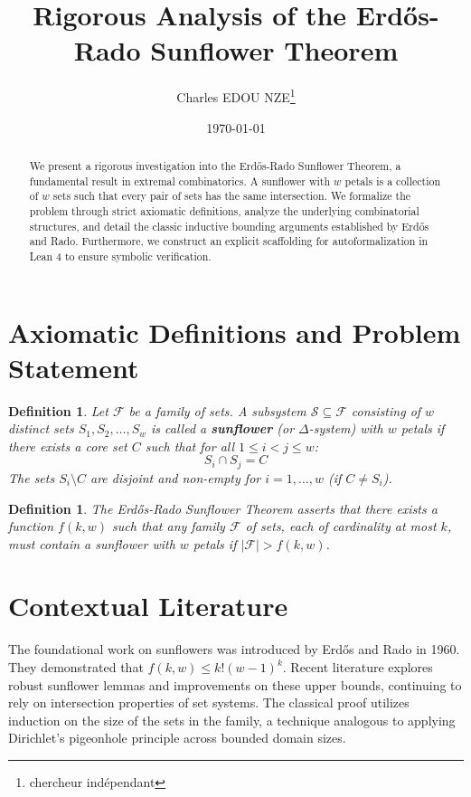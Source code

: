 \documentclass[12pt,a4paper]{article}
\title{Rigorous Analysis of the Erd\H{o}s-Rado Sunflower Theorem}
\author{Charles EDOU NZE\thanks{chercheur ind\'ependant}}
\date{\today}
\newtheorem{definition}[theorem]{Definition}
\begin{document}
\maketitle
\thispagestyle{fancy}
\fancyhf{}
\renewcommand{\headrulewidth}{0pt}

\begin{abstract}
We present a rigorous investigation into the Erd\H{o}s-Rado Sunflower Theorem, a fundamental result in extremal combinatorics. A sunflower with $w$ petals is a collection of $w$ sets such that every pair of sets has the same intersection. We formalize the problem through strict axiomatic definitions, analyze the underlying combinatorial structures, and detail the classic inductive bounding arguments established by Erd\H{o}s and Rado. Furthermore, we construct an explicit scaffolding for autoformalization in Lean 4 to ensure symbolic verification.
\end{abstract}

\section{Axiomatic Definitions and Problem Statement}
\begin{definition}
Let $\mathcal{F}$ be a family of sets. A subsystem $\mathcal{S} \subseteq \mathcal{F}$ consisting of $w$ distinct sets $S_1, S_2, \dots, S_w$ is called a \textbf{sunflower} (or $\Delta$-system) with $w$ petals if there exists a core set $C$ such that for all $1 \le i < j \le w$:
\begin{equation}
S_i \cap S_j = C \label{eq:sunflower}
\end{equation}
The sets $S_i \setminus C$ are disjoint and non-empty for $i = 1, \dots, w$ (if $C \neq S_i$).
\end{definition}
\begin{definition}
The Erd\H{o}s-Rado Sunflower Theorem asserts that there exists a function $f(k, w)$ such that any family $\mathcal{F}$ of sets, each of cardinality at most $k$, must contain a sunflower with $w$ petals if $|\mathcal{F}| > f(k, w)$.
\end{definition}

\section{Contextual Literature}
The foundational work on sunflowers was introduced by Erd\H{o}s and Rado in 1960. They demonstrated that $f(k, w) \le k!(w-1)^k$. Recent literature explores robust sunflower lemmas and improvements on these upper bounds, continuing to rely on intersection properties of set systems. The classical proof utilizes induction on the size of the sets in the family, a technique analogous to applying Dirichlet's pigeonhole principle across bounded domain sizes.
\end{document}
